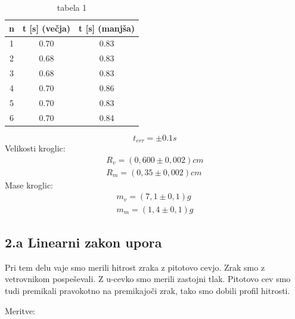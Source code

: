 \documentclass[11pt]{article}
\begin{document}
    \begin{table}[H]
        \centering
        \begin{tabular}{|c|c|c|}
            \hline
            n & t [s] (večja) & t [s] (manjša)\\
            \hline
            1 & 0.70 & 0.83 \\
            2 & 0.68 & 0.83 \\
            3 & 0.68 & 0.83 \\
            4 & 0.70 & 0.86 \\
            5 & 0.70 & 0.83 \\
            6 & 0.70 & 0.84 \\
            \hline
        \end{tabular}
        \caption{tabela 1}
        \label{tab:1}
    \end{table}
    \[
        t_{err} = \pm 0.1 s
    \]
    Velikosti kroglic:
    \begin{align*}
        R_v = (0,600 \pm 0,002)cm \\
        R_m = (0,35 \pm 0,002)cm
    \end{align*}
    Mase kroglic:
    \begin{align*}
        m_v = (7,1 \pm 0,1)g \\
        m_m = (1,4 \pm 0,1)g
    \end{align*}

    \subsection{2.a Linearni zakon upora}
    Pri tem delu vaje smo merili hitrost zraka z pitotovo cevjo.
    Zrak smo z vetrovnikom pospeševali.
    Z u-cevko smo merili zastojni tlak.
    Pitotovo cev smo tudi premikali pravokotno na premikajoči zrak, tako smo dobili profil hitrosti.

    Meritve:
\end{document}
